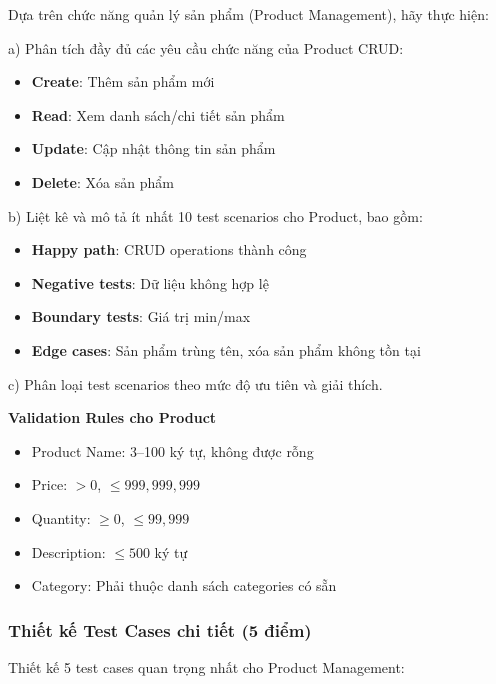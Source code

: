 \documentclass[a4paper,12pt]{article}
\begin{document}
Dựa trên chức năng quản lý sản phẩm (Product Management), hãy thực hiện:

a) Phân tích đầy đủ các yêu cầu chức năng của Product CRUD:

\begin{itemize}
    \item \textbf{Create}: Thêm sản phẩm mới
    \item \textbf{Read}: Xem danh sách/chi tiết sản phẩm
    \item \textbf{Update}: Cập nhật thông tin sản phẩm
    \item \textbf{Delete}: Xóa sản phẩm
\end{itemize}

b) Liệt kê và mô tả ít nhất 10 test scenarios cho Product, bao gồm:

\begin{itemize}
    \item \textbf{Happy path}: CRUD operations thành công
    \item \textbf{Negative tests}: Dữ liệu không hợp lệ
    \item \textbf{Boundary tests}: Giá trị min/max
    \item \textbf{Edge cases}: Sản phẩm trùng tên, xóa sản phẩm không tồn tại
\end{itemize}

c) Phân loại test scenarios theo mức độ ưu tiên và giải thích.

\textbf{Validation Rules cho Product}

\begin{itemize}
    \item Product Name: 3–100 ký tự, không được rỗng
    \item Price: $> 0$, $\le 999{,}999{,}999$
    \item Quantity: $\ge 0$, $\le 99{,}999$
    \item Description: $\le 500$ ký tự
    \item Category: Phải thuộc danh sách categories có sẵn
\end{itemize}


\subsubsection{Thiết kế Test Cases chi tiết (5 điểm)}
Thiết kế 5 test cases quan trọng nhất cho Product Management:
\end{document}
